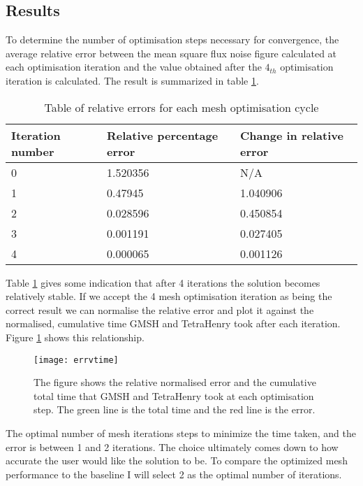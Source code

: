\subsection{Results}

To determine the number of optimisation steps necessary for convergence, the average relative error between the mean square flux noise figure calculated at each optimisation iteration and the value obtained after the $4_{th}$ optimisation iteration is calculated. The result is summarized in table \ref{tab:relerr}.


\begin{table}[H]
    \centering
    \begin{tabular}{lll}
    \hline
    Iteration number & Relative percentage error & Change in relative error \\ \hline
    0                & 1.520356                  & N/A                      \\
    1                & 0.47945                   & 1.040906                 \\
    2                & 0.028596                  & 0.450854                 \\
    3                & 0.001191                  & 0.027405                 \\
    4                & 0.000065                  & 0.001126                 \\ \hline         
    \end{tabular}
    \caption{Table of relative errors for each mesh optimisation cycle}
    \label{tab:relerr}
\end{table}

Table \ref{tab:relerr} gives some indication that after 4 iterations the solution becomes relatively stable. If we accept the 4 mesh optimisation iteration as being the correct result we can normalise the relative error and plot it against the normalised, cumulative time GMSH and TetraHenry took after each iteration. Figure \ref{fig:errvtime} shows this relationship.

\begin{figure}[H]
    \centering
    \texttt{[image: errvtime]}
    \caption{The figure shows the relative normalised error and the cumulative total time that GMSH and TetraHenry took at each optimisation step. The green line is the total time and the red line is the error.}
    \label{fig:errvtime}
\end{figure}

The optimal number of mesh iterations steps to minimize the time taken, and the error is between 1 and 2 iterations. The choice ultimately comes down to how accurate the user would like the solution to be. To compare the optimized mesh performance to the baseline I will select 2 as the optimal number of iterations. \par

